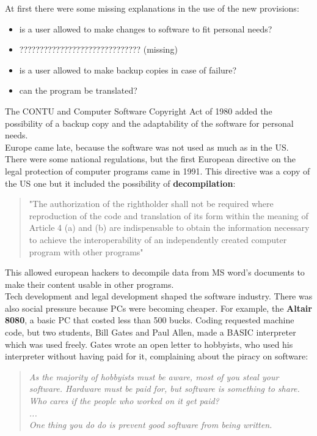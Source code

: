 \documentclass[a4paper, 10pt, titlepage]{article}
\begin{document}
At first there were some missing explanations in the use of the new provisions:
\begin{itemize}
\item is a user allowed to make changes to software to fit personal needs?
\item ?????????????????????????????? (missing)
\item is a user allowed to make backup copies in case of failure?
\item can the program be translated?
\end{itemize}
The CONTU and Computer Software Copyright Act of 1980 added the possibility of a backup copy and the adaptability of the software for personal needs. \medskip \\
Europe came late, because the software was not used as much as in the US. There were some national regulations, but the first European directive on the legal protection of computer programs came in 1991. This directive was a copy of the US one but it included the possibility of \textbf{decompilation}:
\begin{quote}
"The authorization of the rightholder shall not be required where reproduction of the code and translation of its form within the meaning of Article 4 (a) and (b) are indispensable to obtain the information necessary to achieve the interoperability of an independently created computer program with other programs"
\end{quote}
This allowed european hackers to decompile data from MS word's documents to make their content usable in other programs. \medskip \\
Tech development and legal development shaped the software industry. There was also social pressure because PCs were becoming cheaper.
For example, the \textbf{Altair 8080}, a basic PC that costed less than 500 bucks. Coding requested machine code, but two students, Bill Gates and Paul Allen, made a BASIC interpreter which was used freely. Gates wrote an open letter to hobbyists, who used his interpreter without having paid for it, complaining about the piracy on software:
\begin{quote}
\textit{As the majority of hobbyists must be aware, most of you steal your software. Hardware must be paid for, but software is something to share. Who cares if the people who worked on it get paid?\\
...\\
One thing you do do is prevent good software from being written.}
\end{quote}
\end{document}
